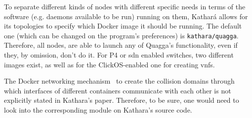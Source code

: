 To separate different kinds of nodes with different specific needs in terms of the software (e.g. daemons available to be run) running on them, Kathará allows for its topologies to specify which Docker image it should be running.
The default one (which can be changed on the program's preferences) is \texttt{kathara/quagga}. Therefore, all nodes, are able to launch any of Quagga's functionality, even if they, by omission, don't do it.
For P4 or \gls{sdn} enabled switches, two different images exist, as well as for the ClickOS-enabled one for creating \glspl{vnf}.

The Docker networking mechanism~\cite{dockernetworking} to create the collision domains through which interfaces of different containers communicate with each other is not explicitly stated in Kathara's paper.
Therefore, to be sure, one would need to look into the corresponding module on Kathara's source code.


